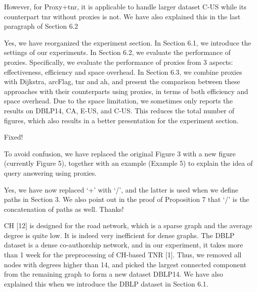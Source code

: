\documentclass[11pt]{letter}
\newcommand{\svs}{\vspace{0.36ex}}
\newcommand{\ah}{{\sc ah}\xspace}
\newcommand{\arcflag}{{\sc arcFlag}\xspace}
\newcommand{\tnr}{{\sc tnr}\xspace}
\begin{document}
However, for Proxy+\tnr, it is applicable to handle larger dataset C-US while its counterpart \tnr without proxies is not. We have also explained this in the last paragraph of Section 6.2




\svs

Yes, we have reorganized the experiment section. In Section 6.1, we introduce the settings of our experiments. In Section 6.2, we evaluate the performance of proxies. Specifically, we evaluate the performance of proxies from 3 aspects: effectiveness, efficiency and space overhead. In Section 6.3, we combine proxies with Dijkstra, \arcflag, \tnr and \ah, and present the comparison between these approaches with their counterparts using proxies, in terms of both efficiency and space overhead.  Due to the space limitation, we sometimes only reports the results on DBLP14, CA, E-US, and C-US. This reduces the total number of figures, which also results in a better presentation for the  experiment section.



\svs
Fixed!


\svs
To avoid confusion, we have replaced the original Figure 3 with a new figure (currently Figure 5), together with an example (Example 5) to explain the idea of query answering using proxies.  


\svs
Yes, we have now replaced `+' with `/', and the latter is used when we define paths in Section 3.
We also point out in the proof of Proposition 7 that `/' is the concatenation of paths as well.
%
Thanks!


\svs
CH [12] is designed for the road network, which is a sparse graph and the average degree is quite low. It is indeed very inefficient for dense graphs. The DBLP dataset is a dense co-authorship network, and in our experiment, it takes more than 1 week for the preprocessing of CH-based TNR [1]. Thus, we removed all nodes with degrees higher than 14, and picked the largest connected component from the remaining graph to form a new dataset DBLP14. We have also explained this when we introduce the DBLP dataset in Section 6.1.
\end{document}
